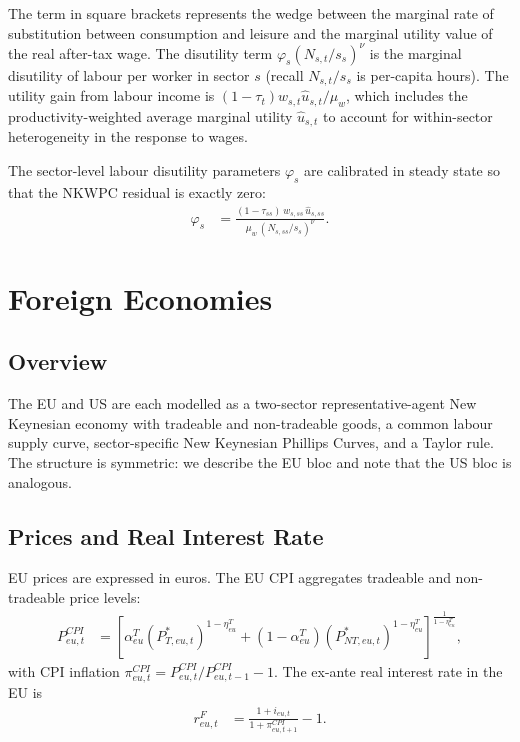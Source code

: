 \documentclass[12pt,a4paper]{article}
\begin{document}
The term in square brackets represents the wedge between the marginal rate of substitution between consumption and leisure and the marginal utility value of the real after-tax wage. The disutility term $\varphi_s(N_{s,t}/s_s)^\nu$ is the marginal disutility of labour per worker in sector $s$ (recall $N_{s,t}/s_s$ is per-capita hours). The utility gain from labour income is $(1-\tau_t)w_{s,t}\hat{u}_{s,t}/\mu_w$, which includes the productivity-weighted average marginal utility $\hat{u}_{s,t}$ to account for within-sector heterogeneity in the response to wages.

The sector-level labour disutility parameters $\varphi_s$ are calibrated in steady state so that the NKWPC residual is exactly zero:
\begin{align}
    \varphi_s &= \frac{(1-\tau_{ss})\,w_{s,ss}\,\hat{u}_{s,ss}}{\mu_w\,(N_{s,ss}/s_s)^\nu}.
    \label{eq:varphi_s_calib}
\end{align}


\section{Foreign Economies}
\label{sec:foreign}

\subsection{Overview}

The EU and US are each modelled as a two-sector representative-agent New Keynesian economy with tradeable and non-tradeable goods, a common labour supply curve, sector-specific New Keynesian Phillips Curves, and a Taylor rule. The structure is symmetric: we describe the EU bloc and note that the US bloc is analogous.

\subsection{Prices and Real Interest Rate}

EU prices are expressed in euros. The EU CPI aggregates tradeable and non-tradeable price levels:
\begin{align}
    P^{CPI}_{eu,t} &= \left[
        \alpha^T_{eu}\!\left(P^*_{T,eu,t}\right)^{1-\eta^T_{eu}}
        + (1-\alpha^T_{eu})\!\left(P^*_{NT,eu,t}\right)^{1-\eta^T_{eu}}
    \right]^{\!\frac{1}{1-\eta^T_{eu}}},
    \label{eq:PCPI_eu}
\end{align}
with CPI inflation $\pi^{CPI}_{eu,t} = P^{CPI}_{eu,t}/P^{CPI}_{eu,t-1} - 1$. The ex-ante real interest rate in the EU is
\begin{align}
    r^F_{eu,t} &= \frac{1+i_{eu,t}}{1+\pi^{CPI}_{eu,t+1}} - 1.
    \label{eq:rF_eu}
\end{align}
\end{document}
